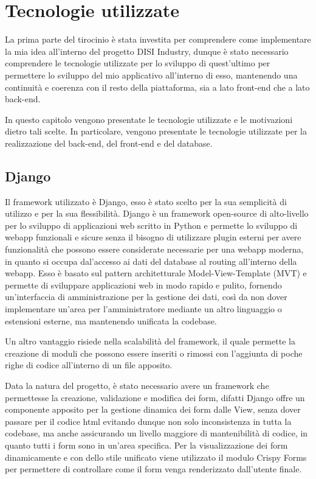 \chapter{Tecnologie utilizzate}
\label{cha:tecnologie_utilizzate}

La prima parte del tirocinio è stata investita per comprendere come implementare la mia idea all'interno del progetto DISI Industry, dunque è stato necessario comprendere le tecnologie utilizzate per lo sviluppo di quest'ultimo per permettere lo sviluppo del mio applicativo all'interno di esso, mantenendo una continuità e coerenza con il resto della piattaforma, sia a lato front-end che a lato back-end.

In questo capitolo vengono presentate le tecnologie utilizzate e le motivazioni dietro tali scelte. In particolare, vengono presentate le tecnologie utilizzate per la realizzazione del back-end, del front-end e del database.

\section{Django}
Il framework utilizzato è Django, esso è stato scelto per la sua semplicità di utilizzo e per la sua flessibilità. Django è un framework open-source di alto-livello per lo sviluppo di applicazioni web scritto in Python e permette lo sviluppo di webapp funzionali e sicure senza il bisogno di utilizzare plugin esterni per avere funzionalità che possono essere considerate necessarie per una webapp moderna, in quanto si occupa dal'accesso ai dati del database al routing all'interno della webapp. Esso è basato sul pattern architetturale Model-View-Template (MVT) e permette di sviluppare applicazioni web in modo rapido e pulito, fornendo un'interfaccia di amministrazione per la gestione dei dati, così da non dover implementare un'area per l'amministratore mediante un altro linguaggio o estensioni esterne, ma mantenendo unificata la codebase.

Un altro vantaggio risiede nella scalabilità del framework, il quale permette la creazione di moduli che possono essere inseriti o rimossi con l'aggiunta di poche righe di codice all'interno di un file apposito.


Data la natura del progetto, è stato necessario avere un framework che permettesse la creazione, validazione e modifica dei form, difatti Django offre un componente apposito per la gestione dinamica dei form dalle View, senza dover passare per il codice html evitando dunque non solo inconsistenza in tutta la codebase, ma anche assicurando un livello maggiore di mantenibilità di codice, in quanto tutti i form sono in un'area specifica. Per la visualizzazione dei form dinamicamente e con dello stile unificato viene utilizzato il modulo Crispy Forms per permettere di controllare come il form venga renderizzato dall'utente finale. \cite{crispy_forms}


